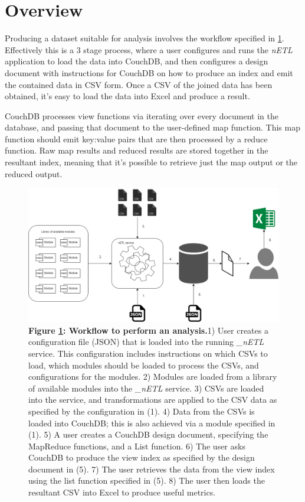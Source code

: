 \section{Overview}
Producing a dataset suitable for analysis involves the workflow specified in \ref{analysis-workflow}. Effectively this is a 3 stage process, where a user configures and runs the \textit{nETL} application to load the data into CouchDB, and then configures a design document with instructions for CouchDB on how to produce an index and emit the contained data in CSV form. Once a CSV of the joined data has been obtained, it's easy to load the data into Excel and produce a result.

CouchDB processes view functions via iterating over every document in the database, and passing that document to the user-defined map function. This map function should emit key:value pairs that are then processed by a reduce function. Raw map results and reduced results are stored together in the resultant index, meaning that it's possible to retrieve just the map output or the reduced output.

\begin{figure}[ht]
    \centering
    \begin{mdframed}
        \centering
        \includegraphics[scale=0.35]{./resources/figures/analysis-workflow.png}
    \end{mdframed}
    \caption[Analysis Workflow]{\textbf{Figure \ref{analysis-workflow}: Workflow to perform an analysis.}1) User creates a configuration file (JSON) that is loaded into the running \textit{\_nETL} service. This configuration includes instructions on which CSVs to load, which modules should be loaded to process the CSVs, and configurations for the modules. 2) Modules are loaded from a library of available modules into the \textit{\_nETL} service. 3) CSVs are loaded into the service, and transformations are applied to the CSV data as specified by the configuration in (1). 4) Data from the CSVs is loaded into CouchDB; this is also achieved via a module specified in (1). 5) A user creates a CouchDB design document, specifying the MapReduce functions, and a List function. 6) The user asks CouchDB to produce the view index as specified by the design document in (5). 7) The user retrieves the data from the view index using the list function specified in (5). 8) The user then loads the resultant CSV into Excel to produce useful metrics.}
    \label{analysis-workflow}
\end{figure}



